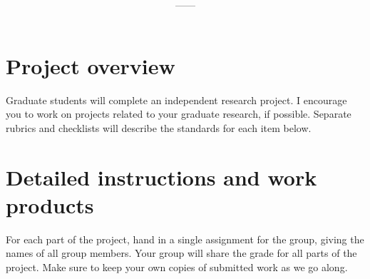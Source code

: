 \documentclass[11pt,onecolumn]{article}
\title{\textbf{\coursename}}
\author{{\semester}---{\roomnumb}---{\classtimes}}
\date{}
\makeatletter
\newcommand{\myname}{A.~Grant Schissler}
\newcommand{\myemail}{aschissler@unr.edu}
\newcommand{\office}{DMSC 224}
\newcommand{\officehours}{Tue 2:30pm-3:30pm, Wed 1:30pm-2:30pm, or by appointment}
\makeatother
\begin{document}
\maketitle

\vspace{-0.25in}
\noindent\makebox[\linewidth]{\rule{\textwidth}{1pt}}


\section*{Project overview}
Graduate students will complete an independent research project. I encourage you to work on projects related to your graduate research, if possible. Separate rubrics and checklists will describe the standards for each item below.

\section*{Detailed instructions and work products}

For each part of the project, hand in a single assignment for the group, giving the names of all group members. Your group will share the grade for all parts of the project. Make sure to keep your own copies of submitted work as we go along. 
\end{document}
